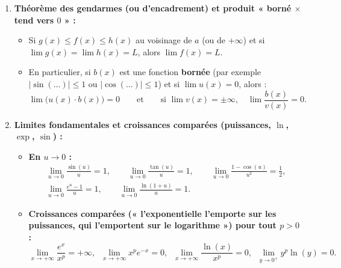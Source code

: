 \begin{theoreme}
\begin{enumerate}
    \item \textbf{Théorème des gendarmes (ou d'encadrement) et produit « borné $\times$ tend vers $0$ » :}
    \begin{itemize}
        \item Si $g(x) \le f(x) \le h(x)$ au voisinage de $a$ (ou de $+\infty$) et si $\lim g(x) = \lim h(x) = L$, alors $\lim f(x) = L$.
        \item En particulier, si $b(x)$ est une fonction \textbf{bornée} (par exemple $|\sin(\dots)| \le 1$ ou $|\cos(\dots)| \le 1$) et si $\lim u(x) = 0$, alors :
        \[
            \boxed{\lim \bigl(u(x) \cdot b(x)\bigr) = 0} \qquad \text{et} \qquad \text{si } \lim v(x) = \pm\infty, \quad \boxed{\lim \frac{b(x)}{v(x)} = 0}.
        \]
    \end{itemize}
    \item \textbf{Limites fondamentales et croissances comparées (puissances, $\ln$, $\exp$, $\sin$) :}
    \begin{itemize}
        \item \textbf{En $u \to 0$ :}
        \begin{gather*}
            \boxed{\lim_{u \to 0} \frac{\sin(u)}{u} = 1}, \qquad \boxed{\lim_{u \to 0} \frac{\tan(u)}{u} = 1}, \qquad \boxed{\lim_{u \to 0} \frac{1 - \cos(u)}{u^2} = \frac{1}{2}}, \\[4pt]
            \boxed{\lim_{u \to 0} \frac{e^u - 1}{u} = 1}, \qquad \boxed{\lim_{u \to 0} \frac{\ln(1+u)}{u} = 1}.
        \end{gather*}
        \item \textbf{Croissances comparées (« l'exponentielle l'emporte sur les puissances, qui l'emportent sur le logarithme ») pour tout $p > 0$ :}
        \[
            \boxed{\lim_{x \to +\infty} \frac{e^x}{x^p} = +\infty}, \;\; \boxed{\lim_{x \to +\infty} x^p e^{-x} = 0}, \;\; \boxed{\lim_{x \to +\infty} \frac{\ln(x)}{x^p} = 0}, \;\; \boxed{\lim_{y \to 0^+} y^p \ln(y) = 0}.
        \]
    \end{itemize}
\end{enumerate}
\end{theoreme}

